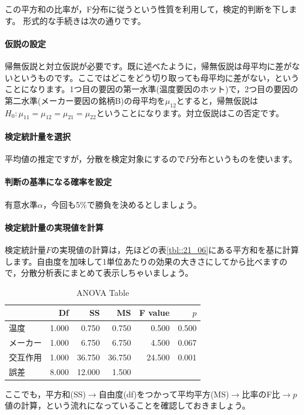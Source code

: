 \documentclass{ltjbook}
\begin{document}
			この平方和の比率が，F分布に従うという性質を利用して，検定的判断を下します。
			形式的な手続きは次の通りです。
			\paragraph{仮説の設定}帰無仮説と対立仮説が必要です。既に述べたように，帰無仮説は母平均に差がないというものです。ここではどこをどう切り取っても母平均に差がない，ということになります。1つ目の要因の第一水準(温度要因のホット)で，2つ目の要因の第二水準(メーカー要因の銘柄B)の母平均を$\mu_{12}$とすると，帰無仮説は$H_0:\mu_{11}=\mu_{12}=\mu_{21}=\mu_{22}$ということになります。対立仮説はこの否定です。
			\paragraph{検定統計量を選択}平均値の推定ですが，分散を検定対象にするので$F$分布というものを使います。
			\paragraph{判断の基準になる確率を設定}有意水準$\alpha$，今回も5\%で勝負を決めるとしましょう。
			\paragraph{検定統計量の実現値を計算}検定統計量$F$の実現値の計算は，先ほどの表\ref{tbl::21_06}にある平方和を基に計算します。自由度を加味して1単位あたりの効果の大きさにしてから比べますので，分散分析表にまとめて表示しちゃいましょう。
			\begin{table}[ht]
				\centering
				\caption{ANOVA Table}
				\begin{tabular}{lrrrrr}
					\hline
					     & Df    & SS     & MS     & F value & $p$   \\
					\hline
					温度   & 1.000 & 0.750  & 0.750  & 0.500   & 0.500 \\
					メーカー & 1.000 & 6.750  & 6.750  & 4.500   & 0.067 \\
					交互作用 & 1.000 & 36.750 & 36.750 & 24.500  & 0.001 \\
					誤差   & 8.000 & 12.000 & 1.500  &         &       \\
					\hline
				\end{tabular}
				\label{tbl::22_04}
			\end{table}

			ここでも，平方和(SS)$\to$自由度(df)をつかって平均平方(MS)$\to$比率のF比$\to$$p$値の計算，という流れになっていることを確認しておきましょう。
\end{document}
